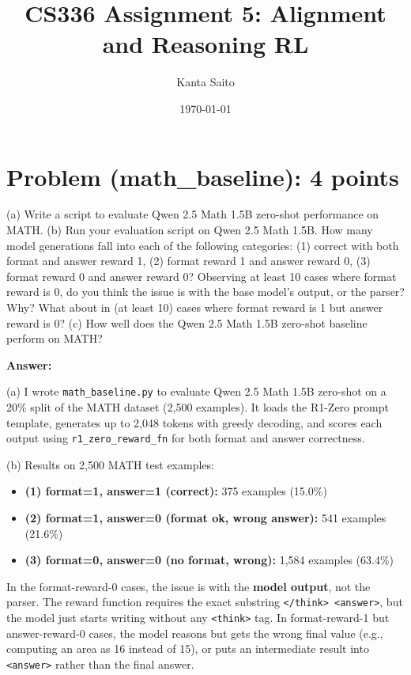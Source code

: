 \documentclass{article}
\title{CS336 Assignment 5: Alignment and Reasoning RL}
\author{Kanta Saito}
\date{\today}
\begin{document}
\maketitle

\section*{Problem (math\_baseline): 4 points} %
(a) Write a script to evaluate Qwen 2.5 Math 1.5B zero-shot performance on MATH. %
\newline
(b) Run your evaluation script on Qwen 2.5 Math 1.5B. How many model generations fall into each of the following categories: (1) correct with both format and answer reward 1, (2) format reward 1 and answer reward 0, (3) format reward 0 and answer reward 0? Observing at least 10 cases where format reward is 0, do you think the issue is with the base model's output, or the parser? Why? What about in (at least 10) cases where format reward is 1 but answer reward is 0? %
\newline
(c) How well does the Qwen 2.5 Math 1.5B zero-shot baseline perform on MATH? %

\textbf{Answer:}

(a) I wrote \texttt{math\_baseline.py} to evaluate Qwen 2.5 Math 1.5B zero-shot on a 20\% split of the MATH dataset (2,500 examples). It loads the R1-Zero prompt template, generates up to 2,048 tokens with greedy decoding, and scores each output using \texttt{r1\_zero\_reward\_fn} for both format and answer correctness.

(b) Results on 2,500 MATH test examples:
\begin{itemize}
  \item \textbf{(1) format=1, answer=1 (correct):} 375 examples (15.0\%)
  \item \textbf{(2) format=1, answer=0 (format ok, wrong answer):} 541 examples (21.6\%)
  \item \textbf{(3) format=0, answer=0 (no format, wrong):} 1,584 examples (63.4\%)
\end{itemize}
In the format-reward-0 cases, the issue is with the \textbf{model output}, not the parser.
The reward function requires the exact substring \texttt{</think> <answer>}, but the model just starts writing without any \texttt{<think>} tag.
In format-reward-1 but answer-reward-0 cases, the model reasons but gets the wrong final value
(e.g., computing an area as 16 instead of 15),
or puts an intermediate result into \texttt{<answer>} rather than the final answer.
\end{document}

